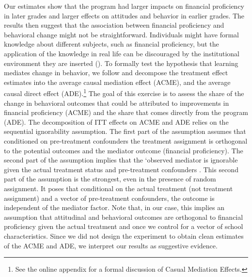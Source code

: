 
Our estimates show that the program had larger impacts on financial proficiency in later grades and larger effects on attitudes and behavior in earlier grades. The results then suggest that the association between financial proficiency and behavioral change might not be straightforward. Individuals might have formal knowledge about different subjects, such as financial proficiency, but the application of the knowledge in real life can be discouraged by the institutional environment they are inserted (\cite{carpena2018causal}). To formally test the hypothesis that learning mediates change in behavior, we follow \cite{imai2011unpacking} and
decompose the treatment effect estimates into the average causal mediation effect (ACME), and
the average causal direct effect (ADE).\footnote {See the online appendix for a formal discussion of Casual Mediation Effects.} The goal of this exercise is to assess the share of the change in behavioral outcomes that could be attributed to improvements in financial proficiency (ACME) and the share that comes directly from the program (ADE).
The decomposition of ITT effects on ACME and ADE relies on the sequential ignorability assumption. The first part of the assumption assumes that conditioned on pre-treatment confounders the treatment assignment is orthogonal to the potential outcomes and the mediator outcome (financial proficiency). The second part of the assumption implies that the `observed mediator is ignorable given the actual treatment status and pre-treatment confounders \citep{imai2011unpacking}. This second part of the assumption is the strongest, even in the presence of random assignment. It poses that conditional on the actual treatment (not treatment assignment) and a vector of pre-treatment confounders, the outcome is independent of the mediator factor. Note that, in our case, this implies an assumption that attitudinal and behavioral outcomes are orthogonal to financial proficiency given the actual treatment and once we control for a vector of school characteristics. Since we did not design the experiment to obtain clean estimates of the ACME and ADE, we interpret our results as suggestive evidence.   

